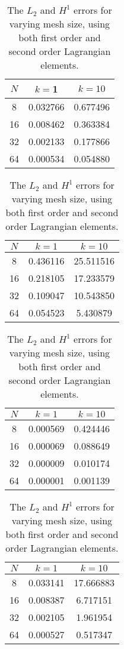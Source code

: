\documentclass[]{article}
\begin{document}
\begin{table}[htpb]
    \centering

    \caption{The $L_2$ and $H^1$ errors for varying mesh size,
    using both first order and second order Lagrangian elements.}

    \label{tbl:errors_1}

    \begin{tabular}{ccc}
        \toprule
        {$N$} &        $k=$1  &        $k=10$ \\
        \midrule
        8  &  0.032766 &  0.677496 \\
        16 &  0.008462 &  0.363384 \\
        32 &  0.002133 &  0.177866 \\
        64 &  0.000534 &  0.054880 \\
        \bottomrule
    \end{tabular}\hspace{4em}
    \begin{tabular}{ccc}
        \toprule
        {$N$} &       $k=1$  &       $k=10$ \\
        \midrule
        8  &  0.436116 &  25.511516 \\
		16 &  0.218105 &  17.233579 \\
		32 &  0.109047 &  10.543850 \\
		64 &  0.054523 &   5.430879 \\
        \bottomrule
    \end{tabular}\vspace{2em}

    
    \begin{tabular}{ccc}
        \toprule
        {$N$} &        $k=1$  &        $k=10$ \\
        \midrule
        8  &  0.000569 &  0.424446 \\
        16 &  0.000069 &  0.088649 \\
        32 &  0.000009 &  0.010174 \\
        64 &  0.000001 &  0.001139 \\
        \bottomrule
    \end{tabular}\hspace{4em}
    \begin{tabular}{ccc}
        \toprule
        {$N$} &       $k=1$  &       $k=10$ \\
        \midrule
        8  &  0.033141 &  17.666883 \\
        16 &  0.008387 &   6.717151 \\
        32 &  0.002105 &   1.961954 \\
        64 &  0.000527 &   0.517347 \\
        \bottomrule
    \end{tabular}

\end{table}
\end{document}
